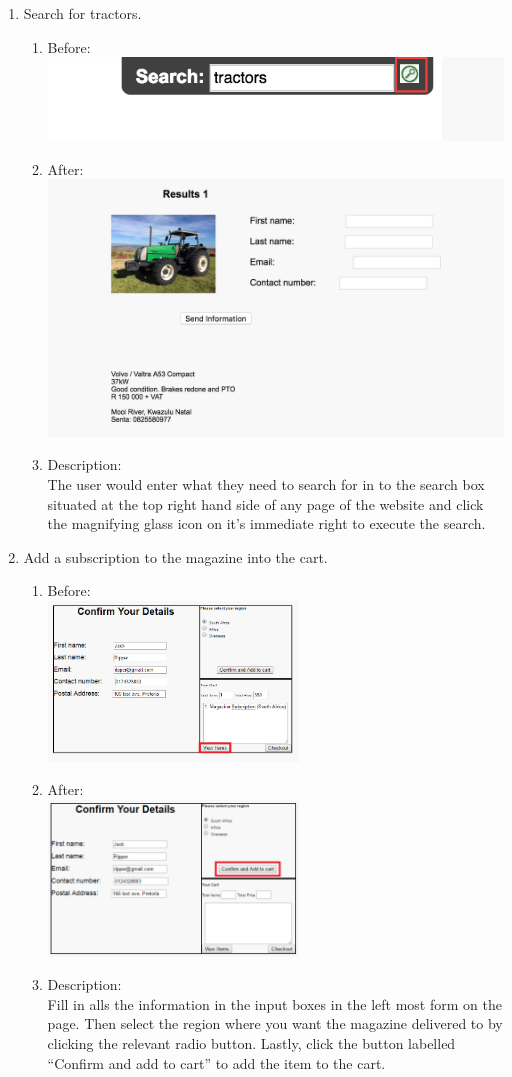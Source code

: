 \documentclass[11pt]{article}
\begin{document}
\begin{enumerate}
		\item Search for tractors.
			\begin{enumerate}
				\item Before: \\
					\includegraphics[width=0.35\linewidth]{../Images/Tasks/Task4Before}
				\item After: \\
					\includegraphics[width=0.4\linewidth]{../Images/Tasks/Task4After}
					\item Description: \\The user would enter what they need to search for in to the search box situated at the top right hand side of any page of the website and click the magnifying glass icon on it’s immediate right to execute the search. \newpage 
			\end{enumerate}		

		\item Add a subscription to the magazine into the cart.
			\begin{enumerate}
				\item Before: \\
					\includegraphics[width=0.55\textwidth]{../Images/Tasks/viewItems.png}
				\item After: \\
					\includegraphics[width=0.55\textwidth]{../Images/Tasks/Subscribe.png}
					\item Description: \\Fill in alls the information in the input boxes in the left most form on the page. Then select the region where you want the magazine delivered to by clicking the relevant radio button. Lastly, click the button labelled “Confirm and add to cart” to add the item to the cart. \newpage
			\end{enumerate}


\end{enumerate}
\end{document}
